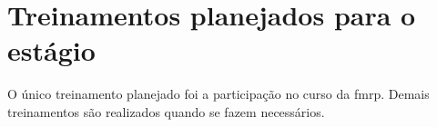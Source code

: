 %
%
%

\section{Treinamentos planejados para o estágio}

O único treinamento planejado foi a participação no curso da \gls{fmrp}. Demais treinamentos são realizados quando se fazem necessários.

%
%
%
% 
